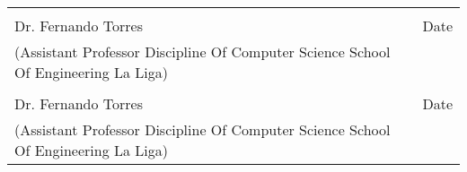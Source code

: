 \documentclass[a4paper, 12pt]{article}
\begin{document}
\vspace{2cm}
\noindent\begin{tabular}{@{}>{\raggedright}p{2.5in}>{\raggedright}p{2.5in}@{}}
	\dotfill                         & \dotfill \tabularnewline
	Dr. Fernando Torres              &  Date \tabularnewline
	(Assistant Professor Discipline Of Computer Science School Of Engineering La Liga)  
									 &  \tabularnewline
									 \dotfill                         & \dotfill \tabularnewline
	Dr. Fernando Torres              &  Date \tabularnewline
	(Assistant Professor Discipline Of Computer Science School Of Engineering La Liga)  
									 &  \tabularnewline
	\end{tabular} 






\end{document}
